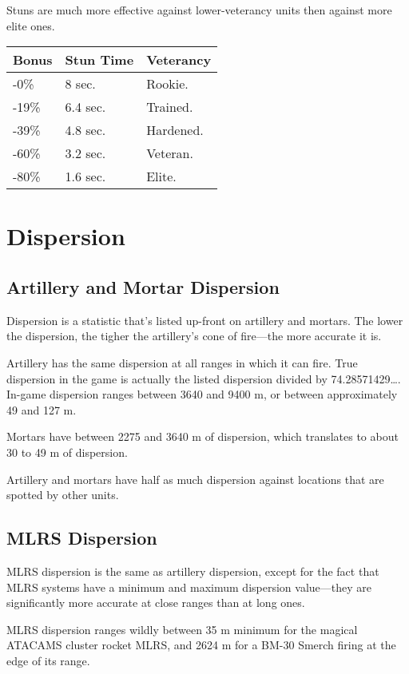 \documentclass{article}
\begin{document}
Stuns are much more effective against lower-veterancy units then against more
elite ones.

\begin{center}
    \begin{tabular}{ | l | l | l |}
    \hline
    Bonus & Stun Time & Veterancy \\ \hline
    -0\%  & 8 sec. &  Rookie. \\
    -19\% & 6.4 sec. & Trained. \\
    -39\% & 4.8 sec. & Hardened. \\
    -60\% & 3.2 sec. & Veteran. \\
    -80\% & 1.6 sec. & Elite. \\
    \hline
    \end{tabular}
\end{center}

\section{Dispersion}

\subsection{Artillery and Mortar Dispersion}

Dispersion is a statistic that's listed up-front on artillery and mortars. The
lower the dispersion, the tigher the artillery's cone of fire---the more
accurate it is.

Artillery has the same dispersion at all ranges in which it can fire. True
dispersion in the game is actually the listed dispersion divided by
74.28571429\ldots . In-game dispersion ranges between 3640 and 9400 m, or
between approximately 49 and 127 m.

Mortars have between 2275 and 3640 m of dispersion, which translates to about 30
to 49 m of dispersion.

Artillery and mortars have half as much dispersion against locations that are
spotted by other units.

\subsection{MLRS Dispersion}
MLRS dispersion is the same as artillery dispersion, except for the fact that
MLRS systems have a minimum and maximum dispersion value---they are
significantly more accurate at close ranges than at long ones.

MLRS dispersion ranges wildly between 35 m minimum for the magical ATACAMS
cluster rocket MLRS, and 2624 m for a BM-30 Smerch firing at the edge of its
range.
\end{document}
